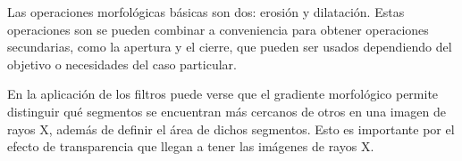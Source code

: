 \documentclass[11pt,a4paper,table]{article}
\begin{document}
Las operaciones morfológicas básicas son dos: erosión y dilatación.
Estas operaciones son se pueden combinar a conveniencia para obtener
operaciones secundarias, como la apertura y el cierre, que pueden ser
usados dependiendo del objetivo o necesidades del caso particular.

En la aplicación de los filtros puede verse que el gradiente morfológico
permite distinguir qué segmentos se encuentran más cercanos de otros en
una imagen de rayos X, además de definir el área de dichos segmentos.
Esto es importante por el efecto de transparencia que llegan a tener las
imágenes de rayos X.

\newpage
    
    
    
        
\end{document}
